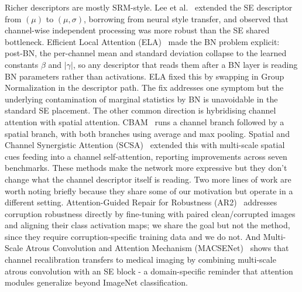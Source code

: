 \documentclass{bmvc2k}
\begin{document}
Richer descriptors are mostly SRM-style. Lee et al.~\cite{lee2020srm} extended the SE descriptor from $(\mu)$ to $(\mu, \sigma)$, borrowing from neural style transfer, and observed that channel-wise independent
processing was more robust than the SE shared bottleneck. Efficient Local Attention (ELA)~\cite{xu2021ela} made the BN problem explicit: post-BN, the per-channel mean and standard deviation collapse to the learned constants $\beta$ and $|\gamma|$, so any descriptor that reads them after a BN layer is reading BN parameters rather than activations. ELA fixed this by
swapping in Group Normalization in the descriptor path. The fix addresses one symptom but the underlying contamination of marginal statistics by BN is unavoidable in the standard SE placement. The other common direction is hybridising channel attention with spatial attention. CBAM~\cite{woo2018cbam} runs a channel branch followed by a spatial branch, with both branches using average and max pooling. Spatial and Channel Synergistic Attention (SCSA)~\cite{si2022scsa} extended this with multi-scale spatial cues feeding into a channel self-attention, reporting improvements across seven benchmarks. These methods make the network more expressive but they don't change what the channel descriptor itself is reading. Two more lines of work are worth noting briefly because they share some of our motivation but operate in a different setting. Attention-Guided Repair for Robustness (AR2)~\cite{zhang2021ar2} addresses corruption robustness directly by fine-tuning with paired clean/corrupted images and aligning their class activation maps; we share the goal but not the method, since they require corruption-specific training data and we do not. And Multi-Scale Atrous Convolution and Attention Mechanism (MACSENet)~\cite{hadi2021macsenet} shows that channel recalibration transfers to medical imaging by combining multi-scale atrous convolution with an SE block - a domain-specific reminder that attention modules generalize beyond ImageNet classification.
\end{document}
